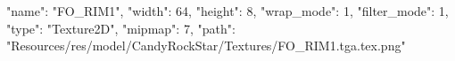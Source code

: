 {
  "name": "FO_RIM1",
  "width": 64,
  "height": 8,
  "wrap_mode": 1,
  "filter_mode": 1,
  "type": "Texture2D",
  "mipmap": 7,
  "path": "Resources/res/model/CandyRockStar/Textures/FO_RIM1.tga.tex.png"
}
